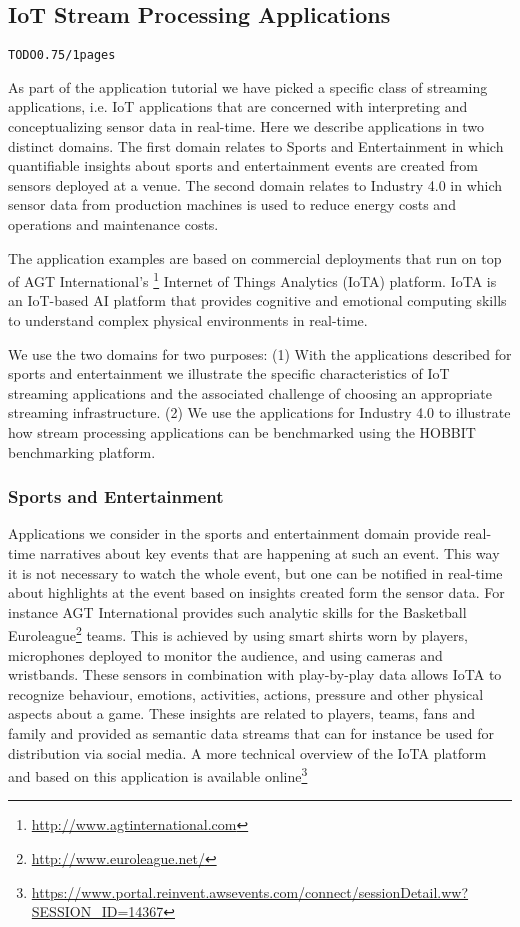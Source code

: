 \subsection{IoT Stream Processing Applications}
\begin{alltt}TODO\scriptsize 0.75/1 pages
\end{alltt}
As part of the application tutorial we have picked a specific class of streaming applications, i.e. IoT applications that are concerned with interpreting and conceptualizing sensor data in real-time. Here we describe applications in two distinct domains. The first domain relates to Sports and Entertainment in which quantifiable insights about sports and entertainment events are created from sensors deployed at a venue. The second domain relates to Industry 4.0 in which sensor data from production machines is used to reduce energy costs and operations and maintenance costs. 

The application examples are based on commercial deployments that run on top of AGT International's \footnote{\url{http://www.agtinternational.com}} Internet of Things Analytics (IoTA) platform. IoTA is an IoT-based AI platform that provides cognitive and emotional computing skills to understand complex physical environments in real-time.

We use the two domains for two purposes: (1) With the applications described for sports and entertainment we illustrate the specific characteristics of IoT streaming applications and the associated challenge of choosing an appropriate streaming infrastructure. (2) We use the applications for Industry 4.0 to illustrate how stream processing applications can be benchmarked using the HOBBIT benchmarking platform.

\subsubsection{Sports and Entertainment}
Applications we consider in the sports and entertainment domain provide real-time narratives about key events that are happening at such an event. This way it is not necessary to watch the whole event, but one can be notified in real-time about highlights at the event based on insights created form the sensor data. For instance AGT International provides such analytic skills for the Basketball Euroleague\footnote{\url{http://www.euroleague.net/}} teams. This is achieved by using smart shirts worn by players, microphones deployed to monitor the audience, and using cameras and wristbands. These sensors in combination with play-by-play data allows IoTA to recognize behaviour, emotions, activities, actions, pressure and other physical aspects about a game. These insights are related to players, teams, fans and family and provided as semantic data streams that can for instance be used for distribution via social media. A more technical overview of the IoTA platform and based on this application is available online\footnote{\url{https://www.portal.reinvent.awsevents.com/connect/sessionDetail.ww?SESSION_ID=14367}}

